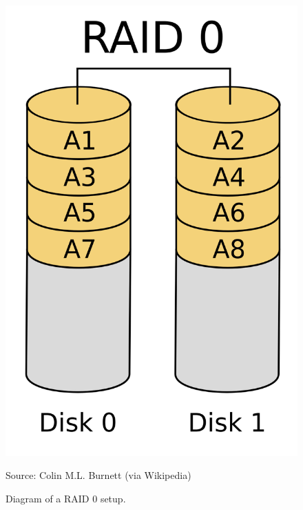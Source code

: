 \documentclass{report}
\newcommand{\source}[1]{\caption*{Source: {#1}} }
\begin{document}
\begin{figure}
  \centering
  \includegraphics[scale=0.1]{1024px-RAID_0.svg.png}
  \caption{Diagram of a RAID 0 setup.}
  \source{Colin M.L. Burnett (via Wikipedia)}
  \label{fig:raid0}
\end{figure}
\end{document}
